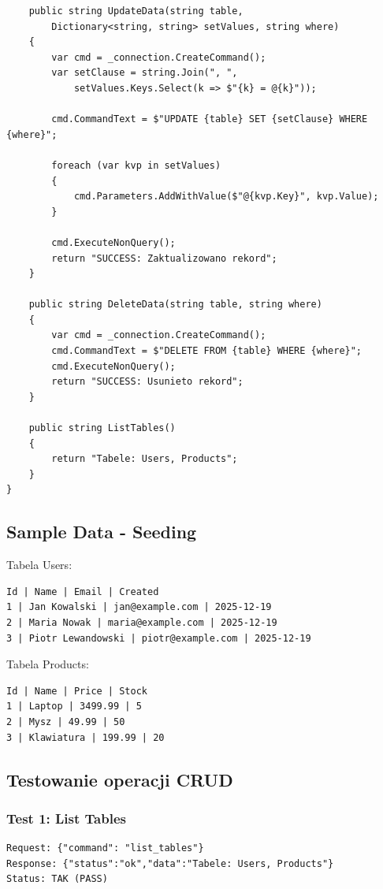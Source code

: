 \documentclass[twoside]{article}
\begin{document}
\begin{lstlisting}
	public string UpdateData(string table, 
		Dictionary<string, string> setValues, string where)
	{
		var cmd = _connection.CreateCommand();
		var setClause = string.Join(", ", 
			setValues.Keys.Select(k => $"{k} = @{k}"));
		
		cmd.CommandText = $"UPDATE {table} SET {setClause} WHERE {where}";
		
		foreach (var kvp in setValues)
		{
			cmd.Parameters.AddWithValue($"@{kvp.Key}", kvp.Value);
		}
		
		cmd.ExecuteNonQuery();
		return "SUCCESS: Zaktualizowano rekord";
	}
	
	public string DeleteData(string table, string where)
	{
		var cmd = _connection.CreateCommand();
		cmd.CommandText = $"DELETE FROM {table} WHERE {where}";
		cmd.ExecuteNonQuery();
		return "SUCCESS: Usunieto rekord";
	}
	
	public string ListTables()
	{
		return "Tabele: Users, Products";
	}
}
\end{lstlisting}

\subsection{Sample Data - Seeding}

Tabela Users:
\begin{verbatim}
Id | Name | Email | Created
1 | Jan Kowalski | jan@example.com | 2025-12-19
2 | Maria Nowak | maria@example.com | 2025-12-19
3 | Piotr Lewandowski | piotr@example.com | 2025-12-19
\end{verbatim}

Tabela Products:
\begin{verbatim}
Id | Name | Price | Stock
1 | Laptop | 3499.99 | 5
2 | Mysz | 49.99 | 50
3 | Klawiatura | 199.99 | 20
\end{verbatim}

\subsection{Testowanie operacji CRUD}

\subsubsection{Test 1: List Tables}
\begin{verbatim}
Request: {"command": "list_tables"}
Response: {"status":"ok","data":"Tabele: Users, Products"}
Status: TAK (PASS)
\end{verbatim}
\end{document}
